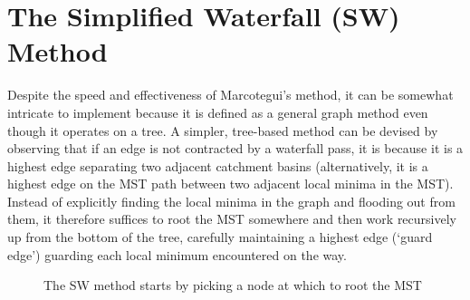 \documentclass[preprint,a4paper]{elsarticle}
\newenvironment{stusubfig}[1]
{
	\begin{figure}[#1]
	\begin{center}
}
{
	\end{center}
	\end{figure}
}
\begin{document}
\section{The Simplified Waterfall (SW) Method}
\label{sec:nicholls}

Despite the speed and effectiveness of Marcotegui's method, it can be somewhat intricate to implement \cite{golodetz08} because it is defined as a general graph method even though it operates on a tree. A simpler, tree-based method can be devised by observing that if an edge is not contracted by a waterfall pass, it is because it is a highest edge separating two adjacent catchment basins (alternatively, it is a highest edge on the MST path between two adjacent local minima in the MST). Instead of explicitly finding the local minima in the graph and flooding out from them, it therefore suffices to root the MST somewhere and then work recursively up from the bottom of the tree, carefully maintaining a highest edge (`guard edge') guarding each local minimum encountered on the way.

\begin{stusubfig}{p}
	\hspace{4mm}%
\caption{The SW method starts by picking a node at which to root the MST}%
\label{fig:segmentation-waterfall-nicholls-root}
\end{stusubfig}
\end{document}
